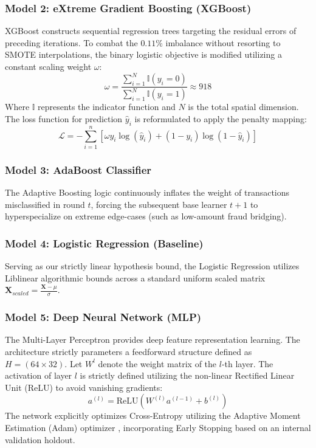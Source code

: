 \documentclass[conference]{IEEEtran}
\begin{document}
\subsubsection{Model 2: eXtreme Gradient Boosting (XGBoost)}
XGBoost \cite{chen2016xgboost} constructs sequential regression trees targeting the residual errors of preceding iterations. To combat the $0.11\%$ imbalance without resorting to SMOTE interpolations, the binary logistic objective is modified utilizing a constant scaling weight $\omega$:
\begin{equation}
    \omega = \frac{\sum_{i=1}^{N} \mathbb{I}(y_i=0)}{\sum_{i=1}^{N} \mathbb{I}(y_i=1)} \approx 918
\end{equation}
Where $\mathbb{I}$ represents the indicator function and $N$ is the total spatial dimension. The loss function for prediction $\hat{y}_i$ is reformulated to apply the penalty mapping:
\begin{equation}
    \mathcal{L} = - \sum_{i=1}^{n} \left[ \omega y_i \log(\hat{y}_i) + (1-y_i) \log(1-\hat{y}_i) \right]
\end{equation}

\subsubsection{Model 3: AdaBoost Classifier}
The Adaptive Boosting logic continuously inflates the weight of transactions misclassified in round $t$, forcing the subsequent base learner $t+1$ to hyperspecialize on extreme edge-cases (such as low-amount fraud bridging).

\subsubsection{Model 4: Logistic Regression (Baseline)}
Serving as our strictly linear hypothesis bound, the Logistic Regression utilizes Liblinear algorithmic bounds across a standard uniform scaled matrix $\mathbf{X}_{scaled} = \frac{\mathbf{X} - \mu}{\sigma}$. 

\subsubsection{Model 5: Deep Neural Network (MLP)}
The Multi-Layer Perceptron provides deep feature representation learning. The architecture strictly parameters a feedforward structure defined as $H = (64 \times 32)$. Let $W^l$ denote the weight matrix of the $l$-th layer. The activation of layer $l$ is strictly defined utilizing the non-linear Rectified Linear Unit (ReLU) to avoid vanishing gradients:
\begin{equation}
    a^{(l)} = \text{ReLU}\left( W^{(l)} a^{(l-1)} + b^{(l)} \right)
\end{equation}
The network explicitly optimizes Cross-Entropy utilizing the Adaptive Moment Estimation (Adam) optimizer \cite{kingma2014adam}, incorporating Early Stopping based on an internal validation holdout.
\end{document}
